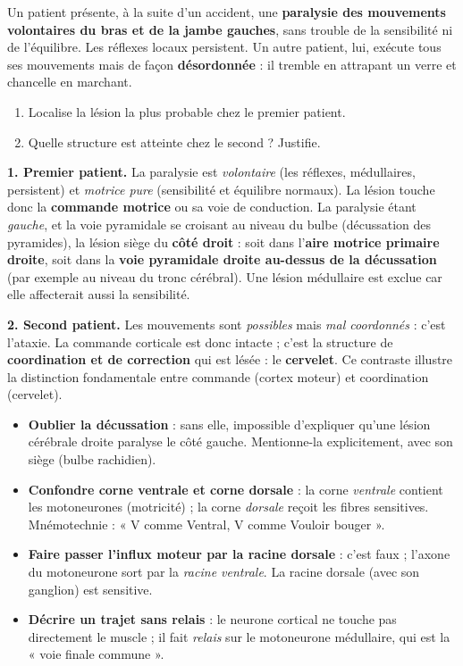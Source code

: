 \documentclass[11pt]{article}
\newcommand{\cle}[1]{{\popxbold\color{popdark}#1}}
\begin{document}
\begin{exoresolu}
Un patient présente, à la suite d'un accident, une \textbf{paralysie des mouvements volontaires du bras et de la jambe gauches}, sans trouble de la sensibilité ni de l'équilibre. Les réflexes locaux persistent. Un autre patient, lui, exécute tous ses mouvements mais de façon \textbf{désordonnée} : il tremble en attrapant un verre et chancelle en marchant.
\begin{enumerate}
\item Localise la lésion la plus probable chez le premier patient.
\item Quelle structure est atteinte chez le second ? Justifie.
\end{enumerate}
\tcblower
\textbf{1. Premier patient.} La paralysie est \emph{volontaire} (les réflexes, médullaires, persistent) et \emph{motrice pure} (sensibilité et équilibre normaux). La lésion touche donc la \textbf{commande motrice} ou sa voie de conduction. La paralysie étant \emph{gauche}, et la voie pyramidale se croisant au niveau du bulbe (\cle{décussation des pyramides}), la lésion siège du \textbf{côté droit} : soit dans l'\textbf{aire motrice primaire droite}, soit dans la \textbf{voie pyramidale droite au-dessus de la décussation} (par exemple au niveau du tronc cérébral). Une lésion médullaire est exclue car elle affecterait aussi la sensibilité.

\textbf{2. Second patient.} Les mouvements sont \emph{possibles} mais \emph{mal coordonnés} : c'est l'\cle{ataxie}. La commande corticale est donc intacte ; c'est la structure de \textbf{coordination et de correction} qui est lésée : le \textbf{cervelet}. Ce contraste illustre la distinction fondamentale entre commande (cortex moteur) et coordination (cervelet).
\end{exoresolu}

\begin{attention}
\begin{itemize}
\item \textbf{Oublier la décussation} : sans elle, impossible d'expliquer qu'une lésion cérébrale droite paralyse le côté gauche. Mentionne-la explicitement, avec son siège (bulbe rachidien).
\item \textbf{Confondre corne ventrale et corne dorsale} : la corne \emph{ventrale} contient les motoneurones (motricité) ; la corne \emph{dorsale} reçoit les fibres sensitives. Mnémotechnie : « V comme Ventral, V comme Vouloir bouger ».
\item \textbf{Faire passer l'influx moteur par la racine dorsale} : c'est faux ; l'axone du motoneurone sort par la \emph{racine ventrale}. La racine dorsale (avec son ganglion) est sensitive.
\item \textbf{Décrire un trajet sans relais} : le neurone cortical ne touche pas directement le muscle ; il fait \emph{relais} sur le motoneurone médullaire, qui est la « voie finale commune ».
\end{itemize}
\end{attention}
\end{document}
